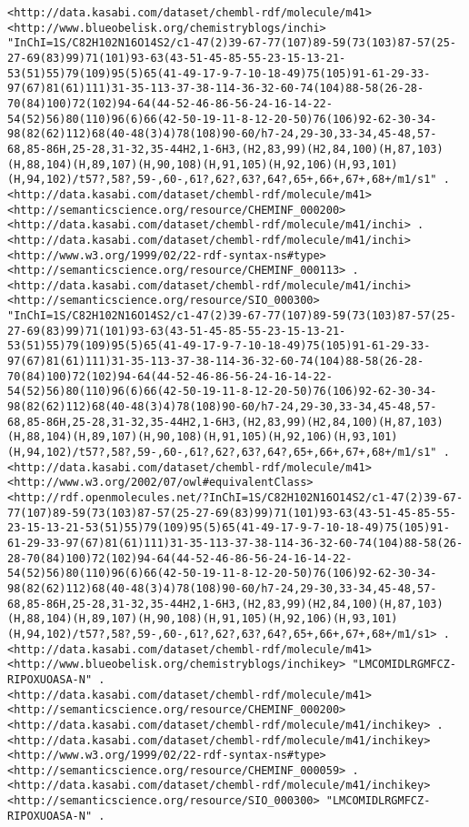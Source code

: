 \documentclass[sw]{iosart2c}
\begin{document}
\begin{tiny}
\begin{verbatim}
<http://data.kasabi.com/dataset/chembl-rdf/molecule/m41> <http://www.blueobelisk.org/chemistryblogs/inchi> "InChI=1S/C82H102N16O14S2/c1-47(2)39-67-77(107)89-59(73(103)87-57(25-27-69(83)99)71(101)93-63(43-51-45-85-55-23-15-13-21-53(51)55)79(109)95(5)65(41-49-17-9-7-10-18-49)75(105)91-61-29-33-97(67)81(61)111)31-35-113-37-38-114-36-32-60-74(104)88-58(26-28-70(84)100)72(102)94-64(44-52-46-86-56-24-16-14-22-54(52)56)80(110)96(6)66(42-50-19-11-8-12-20-50)76(106)92-62-30-34-98(82(62)112)68(40-48(3)4)78(108)90-60/h7-24,29-30,33-34,45-48,57-68,85-86H,25-28,31-32,35-44H2,1-6H3,(H2,83,99)(H2,84,100)(H,87,103)(H,88,104)(H,89,107)(H,90,108)(H,91,105)(H,92,106)(H,93,101)(H,94,102)/t57?,58?,59-,60-,61?,62?,63?,64?,65+,66+,67+,68+/m1/s1" .
<http://data.kasabi.com/dataset/chembl-rdf/molecule/m41> <http://semanticscience.org/resource/CHEMINF_000200> <http://data.kasabi.com/dataset/chembl-rdf/molecule/m41/inchi> .
<http://data.kasabi.com/dataset/chembl-rdf/molecule/m41/inchi> <http://www.w3.org/1999/02/22-rdf-syntax-ns#type> <http://semanticscience.org/resource/CHEMINF_000113> .
<http://data.kasabi.com/dataset/chembl-rdf/molecule/m41/inchi> <http://semanticscience.org/resource/SIO_000300> "InChI=1S/C82H102N16O14S2/c1-47(2)39-67-77(107)89-59(73(103)87-57(25-27-69(83)99)71(101)93-63(43-51-45-85-55-23-15-13-21-53(51)55)79(109)95(5)65(41-49-17-9-7-10-18-49)75(105)91-61-29-33-97(67)81(61)111)31-35-113-37-38-114-36-32-60-74(104)88-58(26-28-70(84)100)72(102)94-64(44-52-46-86-56-24-16-14-22-54(52)56)80(110)96(6)66(42-50-19-11-8-12-20-50)76(106)92-62-30-34-98(82(62)112)68(40-48(3)4)78(108)90-60/h7-24,29-30,33-34,45-48,57-68,85-86H,25-28,31-32,35-44H2,1-6H3,(H2,83,99)(H2,84,100)(H,87,103)(H,88,104)(H,89,107)(H,90,108)(H,91,105)(H,92,106)(H,93,101)(H,94,102)/t57?,58?,59-,60-,61?,62?,63?,64?,65+,66+,67+,68+/m1/s1" .
<http://data.kasabi.com/dataset/chembl-rdf/molecule/m41> <http://www.w3.org/2002/07/owl#equivalentClass> <http://rdf.openmolecules.net/?InChI=1S/C82H102N16O14S2/c1-47(2)39-67-77(107)89-59(73(103)87-57(25-27-69(83)99)71(101)93-63(43-51-45-85-55-23-15-13-21-53(51)55)79(109)95(5)65(41-49-17-9-7-10-18-49)75(105)91-61-29-33-97(67)81(61)111)31-35-113-37-38-114-36-32-60-74(104)88-58(26-28-70(84)100)72(102)94-64(44-52-46-86-56-24-16-14-22-54(52)56)80(110)96(6)66(42-50-19-11-8-12-20-50)76(106)92-62-30-34-98(82(62)112)68(40-48(3)4)78(108)90-60/h7-24,29-30,33-34,45-48,57-68,85-86H,25-28,31-32,35-44H2,1-6H3,(H2,83,99)(H2,84,100)(H,87,103)(H,88,104)(H,89,107)(H,90,108)(H,91,105)(H,92,106)(H,93,101)(H,94,102)/t57?,58?,59-,60-,61?,62?,63?,64?,65+,66+,67+,68+/m1/s1> .
<http://data.kasabi.com/dataset/chembl-rdf/molecule/m41> <http://www.blueobelisk.org/chemistryblogs/inchikey> "LMCOMIDLRGMFCZ-RIPOXUOASA-N" .
<http://data.kasabi.com/dataset/chembl-rdf/molecule/m41> <http://semanticscience.org/resource/CHEMINF_000200> <http://data.kasabi.com/dataset/chembl-rdf/molecule/m41/inchikey> .
<http://data.kasabi.com/dataset/chembl-rdf/molecule/m41/inchikey> <http://www.w3.org/1999/02/22-rdf-syntax-ns#type> <http://semanticscience.org/resource/CHEMINF_000059> .
<http://data.kasabi.com/dataset/chembl-rdf/molecule/m41/inchikey> <http://semanticscience.org/resource/SIO_000300> "LMCOMIDLRGMFCZ-RIPOXUOASA-N" .
\end{verbatim}
\end{tiny}
\end{document}
